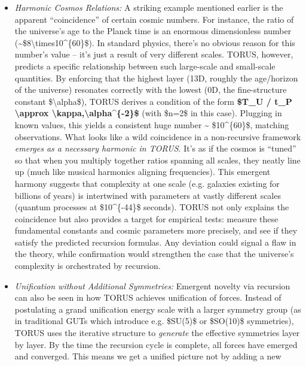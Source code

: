 \documentclass[]{article}
\begin{document}
\begin{itemize}
\item
  \emph{Harmonic Cosmos Relations:} A striking example mentioned earlier
  is the apparent ``coincidence'' of certain cosmic numbers. For
  instance, the ratio of the universe's age to the Planck time is an
  enormous dimensionless number
  (\textasciitilde{}\$8\textbackslash{}times10\^{}\{60\}\$). In standard
  physics, there's no obvious reason for this number's value -- it's
  just a result of very different scales. TORUS, however, predicts a
  specific relationship between such large-scale and small-scale
  quantities. By enforcing that the highest layer (13D, roughly the
  age/horizon of the universe) resonates correctly with the lowest (0D,
  the fine-structure constant \$\textbackslash{}alpha\$), TORUS derives
  a condition of the form \textbf{\$T\_U / t\_P \textbackslash{}approx
  \textbackslash{}kappa,\textbackslash{}alpha\^{}\{-2\}\$} (with \$n=2\$
  in this case)​. Plugging in known values, this yields a consistent
  huge number \textasciitilde{} \$10\^{}\{60\}\$, matching observations.
  What looks like a wild coincidence in a non-recursive framework
  \emph{emerges as a necessary harmonic in TORUS}. It's as if the cosmos
  is ``tuned'' so that when you multiply together ratios spanning all
  scales, they neatly line up (much like musical harmonics aligning
  frequencies). This emergent harmony suggests that complexity at one
  scale (e.g. galaxies existing for billions of years) is intertwined
  with parameters at vastly different scales (quantum processes at
  \$10\^{}\{-44\}\$ seconds). TORUS not only explains the coincidence
  but also provides a target for empirical tests: measure these
  fundamental constants and cosmic parameters more precisely, and see if
  they satisfy the predicted recursion formulas​. Any deviation could
  signal a flaw in the theory, while confirmation would strengthen the
  case that the universe's complexity is orchestrated by recursion.
\item
  \emph{Unification without Additional Symmetries:} Emergent novelty via
  recursion can also be seen in how TORUS achieves unification of
  forces. Instead of postulating a grand unification energy scale with a
  larger symmetry group (as in traditional GUTs which introduce e.g.
  \$SU(5)\$ or \$SO(10)\$ symmetries), TORUS uses the iterative
  structure to \emph{generate} the effective symmetries layer by layer.
  By the time the recursion cycle is complete, all forces have emerged
  and converged. This means we get a unified picture not by adding a new

\end{itemize}
\end{document}
